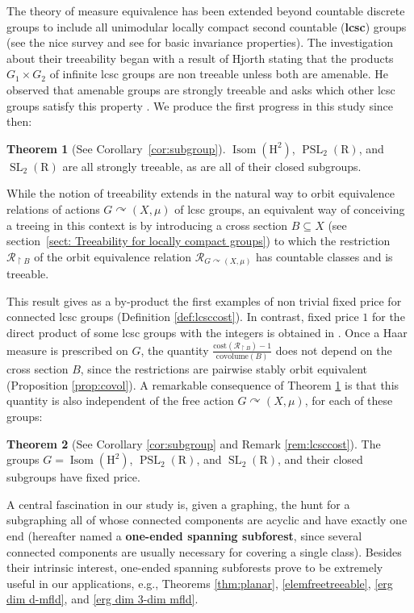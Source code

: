 \documentclass[11pt]{amsart}
\theoremstyle{definition}
\newtheorem{thmintro}{Theorem}
\theoremstyle{plain}
\newcommand{\<}{\langle}
\renewcommand{\>}{\rangle}
\newcommand{\actson}{\curvearrowright}
\newcommand{\restrict}{\restriction}
\DeclareMathOperator{\Isom}{Isom}
\DeclareMathOperator{\SL}{SL}
\DeclareMathOperator{\PSL}{PSL}
\newcommand{\R}{\bm{\mathrm{R}}}
\newcommand{\HH}{\bm{\mathrm{H}}}
\newcommand{\define}[1]{\textbf{#1}}
\newcommand{\pmp}{\text{p.m.p.}}
\newcommand\RR{\mathscr{R}}
\begin{document}
The theory of measure equivalence has been extended beyond countable discrete groups to include all unimodular locally compact second countable (\define{lcsc}) groups (see the nice survey \cite{Furman2011} and see \cite{KKR-2017} for basic invariance properties). The investigation about their treeability began with a result of Hjorth \cite[Theorem 0.5]{Hj08b} stating that the products $G_1\times G_2$ of infinite lcsc groups are non treeable unless both are amenable.
He observed that amenable groups are strongly treeable and asks which other lcsc groups satisfy this property  \cite[p. 387]{Hj08b}.
We produce the first progress in this study since then:
%
\begin{thmintro}[See Corollary~\ref{cor:subgroup}]
\label{th-intro Isom H2, PSL 2 are str. treeable}
$\Isom(\HH ^2)$, $\PSL_2(\R )$, and $\SL_2(\R )$ are all strongly treeable, as are all of their closed subgroups.
\end{thmintro}

While the notion of treeability extends in the natural way to orbit equivalence relations of actions $G\actson (X,\mu)$ of lcsc groups, an equivalent way of conceiving a treeing in this context is by introducing a cross section $B\subseteq X$ (see section~\ref{sect: Treeability for locally compact groups}) to which the restriction $\RR_{\restriction B}$ of the orbit equivalence relation $\RR_{G\actson (X,\mu)}$
has countable classes and is treeable.

This result gives as a by-product the first examples of non trivial fixed price for connected lcsc groups (Definition \ref{def:lcsccost}).  In contrast, fixed price $1$ for the direct product of some lcsc groups with the integers is obtained in \cite{AM-21}.  Once a Haar measure is prescribed on $G$, the quantity $\frac{\mathrm{cost}(\RR_{\restrict B})-1}{\mathrm{covolume}(B)}$ does not depend on the cross section $B$, since the restrictions are pairwise stably orbit equivalent (Proposition \ref{prop:covol}).  A remarkable consequence of Theorem \ref{th-intro Isom H2, PSL 2 are str. treeable} is that this quantity is also independent of the free \pmp{} action $G\actson (X,\mu)$, for each of these groups:
\begin{thmintro}[See Corollary \ref{cor:subgroup} and Remark \ref{rem:lcsccost}]
The groups $G=\Isom(\HH ^2)$, $\PSL_2(\R )$, and $\SL_2(\R )$, and their closed subgroups have fixed price.
\end{thmintro}

A central fascination in our study is, given a graphing, the hunt for a subgraphing all of whose connected components are acyclic and have exactly one end (hereafter named a \define{one-ended spanning subforest}, since several connected components are usually necessary for covering a single class). Besides their intrinsic interest, one-ended spanning subforests prove to be extremely useful in our applications, e.g., Theorems \ref{thm:planar}, \ref{elemfreetreeable}, \ref{erg dim d-mfld}, and \ref{erg dim 3-dim mfld}.
\end{document}
